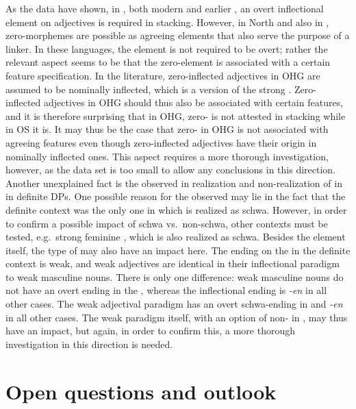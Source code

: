 \documentclass[output=paper,colorlinks,citecolor=brown]{langscibook}
\begin{document}
As the data have shown, in , both modern and earlier , an overt inflectional element on adjectives is required in stacking. However, in North  and also in , zero-morphemes are possible as agreeing elements that also serve the purpose of a linker. In these languages, the element is not required to be overt; rather the relevant aspect seems to be that the zero-element is associated with a certain feature specification. In the literature, zero-inflected adjectives in OHG are assumed to be nominally inflected, which is a version of the strong  \citep[298]{Braune2018AHD}. Zero-inflected adjectives in OHG should thus also be associated with certain features, and it is therefore surprising that in OHG, zero- is not attested in stacking while in OS it is. It may thus be the case that zero- in OHG is not associated with agreeing features even though zero-inflected adjectives have their origin in nominally inflected ones. This aspect requires a more thorough investigation, however, as the data set is too small to allow any conclusions in this direction. Another unexplained fact is the observed  in realization and non-realization of  in  in definite  DPs. One possible reason for the observed  may lie in the fact that the definite  context was the only one in which  is realized as schwa. However, in order to confirm a possible impact of schwa vs.~non-schwa, other contexts must be tested, e.g.~strong feminine , which is also realized as schwa. Besides the element itself, the type of  may also have an impact here. The ending on the  in the definite  context is weak, and weak adjectives are identical in their inflectional paradigm to weak masculine nouns. There is only one difference: weak masculine nouns do not have an overt ending in the , whereas the inflectional ending is \textit{-en} in all other cases. The weak adjectival paradigm has an overt schwa-ending in  and \textit{-en} in all other cases. The weak paradigm itself, with an option of non- in , may thus have an impact, but again, in order to confirm this, a more thorough investigation in this direction is needed.

\section{Open questions and outlook}\label{sect:conclusion}
\end{document}

